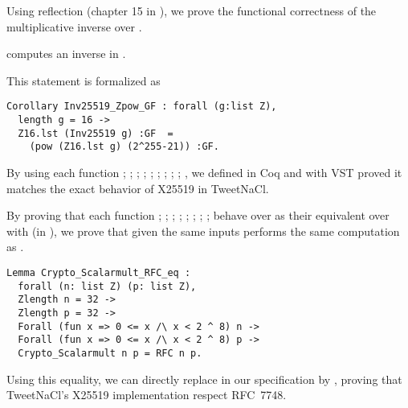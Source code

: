 Using reflection (chapter 15 in \cite{CpdtJFR}), we prove
the functional correctness of the multiplicative inverse over \Zfield.
\begin{lemma}
\label{cor:inv_comput_field}
 computes an inverse in \Zfield.
\end{lemma}
This statement is formalized as
\begin{lstlisting}[language=Coq]
Corollary Inv25519_Zpow_GF : forall (g:list Z),
  length g = 16 ->
  Z16.lst (Inv25519 g) :GF  =
    (pow (Z16.lst g) (2^255-21)) :GF.
\end{lstlisting}

\begin{sloppypar}
By using each function ; ; ; ;
; ; ; ; ;
, we defined in Coq  and with VST
proved it matches the exact behavior of X25519 in TweetNaCl.
\end{sloppypar}

\begin{sloppypar}
By proving that each function ; ; ;
; ; ; ;
;  behave over  as their equivalent
over  with  (in \Zfield), we prove that given the same inputs
 performs the same computation as .
\end{sloppypar}

\begin{lstlisting}[language=Coq]
Lemma Crypto_Scalarmult_RFC_eq :
  forall (n: list Z) (p: list Z),
  Zlength n = 32 ->
  Zlength p = 32 ->
  Forall (fun x => 0 <= x /\ x < 2 ^ 8) n ->
  Forall (fun x => 0 <= x /\ x < 2 ^ 8) p ->
  Crypto_Scalarmult n p = RFC n p.
\end{lstlisting}

Using this equality, we can directly replace  in our
specification by , proving that TweetNaCl's X25519 implementation
respect RFC~7748.




